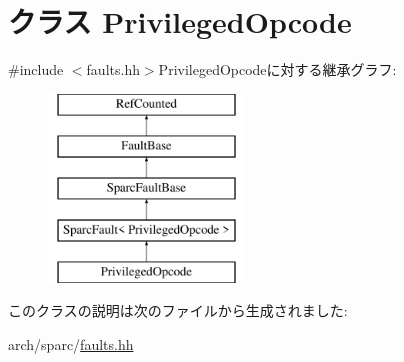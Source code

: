 \hypertarget{classSparcISA_1_1PrivilegedOpcode}{
\section{クラス PrivilegedOpcode}
\label{classSparcISA_1_1PrivilegedOpcode}
}


{\ttfamily \#include $<$faults.hh$>$}PrivilegedOpcodeに対する継承グラフ:\begin{figure}[H]
\begin{center}
\leavevmode
\includegraphics[height=5cm]{classSparcISA_1_1PrivilegedOpcode}
\end{center}
\end{figure}


このクラスの説明は次のファイルから生成されました:\begin{DoxyCompactItemize}
\item 
arch/sparc/\hyperlink{arch_2sparc_2faults_8hh}{faults.hh}\end{DoxyCompactItemize}
